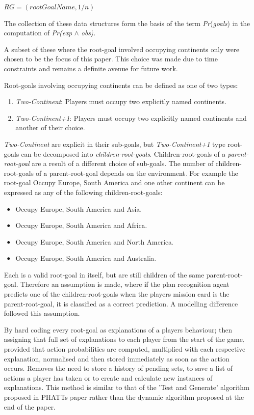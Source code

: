 \documentclass[parskip]{cs4rep}
\begin{document}
\centerline{
 $RG = ( rootGoalName, 1/n)$\newline
}

The collection of these data structures form the basis of the term \textit{Pr}(\textit{goals}) in the computation of \textit{Pr(exp} $\wedge$ \textit{obs)}.

A subset of these where the root-goal involved occupying continents only were chosen to be the focus of this paper. This choice was made due to time constraints and remains a definite avenue for future work. 

Root-goals involving occupying continents can be defined as one of two types:

\begin{enumerate}
\item
\textit{Two-Continent}: Players must occupy two explicitly named continents.
\item
\textit{Two-Continent+1}: Players must occupy two explicitly named continents and another of their choice.
\end{enumerate}

\textit{Two-Continent} are explicit in their sub-goals, but \textit{Two-Continent+1} type root-goals can be decomposed into \textit{children-root-goals}. Children-root-goals of a \textit{parent-root-goal} are a result of a different choice of sub-goals. The number of children-root-goals of a parent-root-goal depends on the environment. For example the root-goal Occupy Europe, South America and one other continent can be expressed as any of the following children-root-goals:

\begin{itemize}
\item
Occupy Europe, South America and Asia.
\item
Occupy Europe, South America and Africa.
\item
Occupy Europe, South America and North America.
\item
Occupy Europe, South America and Australia.\newline
\end{itemize}

Each is a valid root-goal in itself, but are still children of the same parent-root-goal. Therefore an assumption is made, where if the plan recognition agent predicts one of the children-root-goals when the players mission card is the parent-root-goal, it is classified as a correct prediction. A modelling difference followed this assumption.

By hard coding every root-goal as explanations of a players behaviour; then assigning that full set of explanations to each player from the start of the game, provided that action probabilities are computed, multiplied with each respective explanation, normalised and then stored immediately as soon as the action occurs. Removes the need to store a history of pending sets, to save a list of actions a player has taken or to create and calculate new instances of explanations. This method is similar to that of the 'Test and Generate' algorithm proposed in PHATTs paper rather than the dynamic algorithm proposed at the end of the paper.
\end{document}

